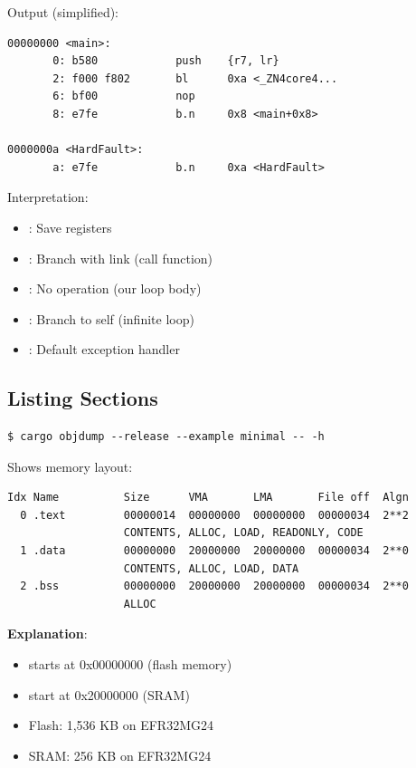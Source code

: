 Output (simplified):
\begin{verbatim}
00000000 <main>:
       0: b580            push    {r7, lr}
       2: f000 f802       bl      0xa <_ZN4core4...
       6: bf00            nop
       8: e7fe            b.n     0x8 <main+0x8>

0000000a <HardFault>:
       a: e7fe            b.n     0xa <HardFault>
\end{verbatim}

Interpretation:
\begin{itemize}
    \item {}: Save registers
    \item {}: Branch with link (call function)
    \item {}: No operation (our loop body)
    \item {}: Branch to self (infinite loop)
    \item {}: Default exception handler
\end{itemize}

\subsection{Listing Sections}
\begin{verbatim}
$ cargo objdump --release --example minimal -- -h
\end{verbatim}

Shows memory layout:
\begin{verbatim}
Idx Name          Size      VMA       LMA       File off  Algn
  0 .text         00000014  00000000  00000000  00000034  2**2
                  CONTENTS, ALLOC, LOAD, READONLY, CODE
  1 .data         00000000  20000000  20000000  00000034  2**0
                  CONTENTS, ALLOC, LOAD, DATA
  2 .bss          00000000  20000000  20000000  00000034  2**0
                  ALLOC
\end{verbatim}

\textbf{Explanation}:
\begin{itemize}
    \item {} starts at 0x00000000 (flash memory)
    \item {} start at 0x20000000 (SRAM)
    \item Flash: 1,536 KB on EFR32MG24
    \item SRAM: 256 KB on EFR32MG24
\end{itemize}

